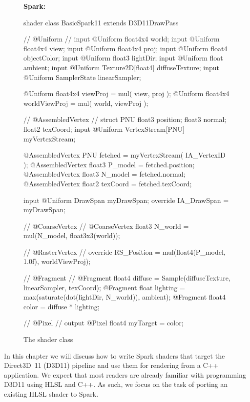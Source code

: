 \documentclass[]{report}
\newcommand{\codeblockheader}[1]{\textbf{\small #1: }}
\newenvironment{codeblockx}[1]%
{\begin{center}\begin{codebox} \codeblockheader{#1}}%
{\end{codebox}\end{center}}
\newcommand{\code}[1]{\text{\lstinline[style=spark_style]{#1}}}
\begin{document}
\begin{figure}
\begin{codeblockx}{Spark}
\begin{spark}
shader class BasicSpark11 extends D3D11DrawPass
{
    // @Uniform
    //
    input @Uniform float4x4          world;
    input @Uniform float4x4          view;
    input @Uniform float4x4          proj;
    input @Uniform float4            objectColor;
    input @Uniform float3            lightDir;
    input @Uniform float             ambient;
    input @Uniform Texture2D[float4] diffuseTexture;
    input @Uniform SamplerState      linearSampler;

    @Uniform float4x4 viewProj      = mul( view, proj );
    @Uniform float4x4 worldViewProj = mul( world, viewProj );

    // @AssembledVertex
    //
    struct PNU
    {
        float3 position;
        float3 normal;
        float2 texCoord;
    }
    input @Uniform VertexStream[PNU] myVertexStream;

    @AssembledVertex PNU    fetched  = myVertexStream( IA_VertexID );
    @AssembledVertex float3 P_model  = fetched.position;
    @AssembledVertex float3 N_model  = fetched.normal;
    @AssembledVertex float2 texCoord = fetched.texCoord;

    input @Uniform DrawSpan myDrawSpan;
    override IA_DrawSpan = myDrawSpan;

    // @CoarseVertex
    //
    @CoarseVertex float3 N_world = mul(N_model, float3x3(world));

    // @RasterVertex
    //
    override RS_Position = mul(float4(P_model, 1.0f), worldViewProj);

    // @Fragment
    //
    @Fragment float4 diffuse  = Sample(diffuseTexture, linearSampler, texCoord);
    @Fragment float  lighting = max(saturate(dot(lightDir, N_world)), ambient);
    @Fragment float4 color    = diffuse * lighting;

    // @Pixel
    //
    output @Pixel float4 myTarget = color;
}
\end{spark}
\end{codeblockx}
\caption{\label{fig:basicspark}The \code{BasicSpark11} shader class}
\end{figure}

In this chapter we will discuss how to write Spark shaders that target the Direct3D~11 (D3D11) pipeline and use them for rendering from a C++ application.
We expect that most readers are already familiar with programming D3D11 using HLSL and C++.
As such, we focus on the task of porting an existing HLSL shader to Spark.
\end{document}

